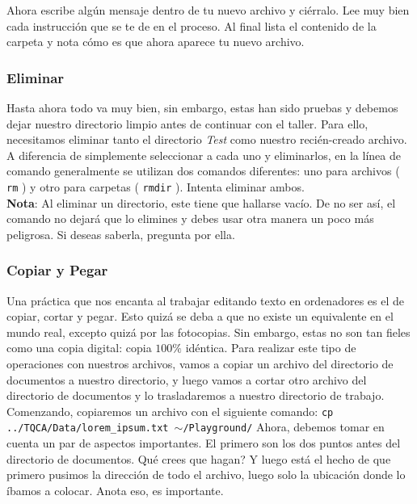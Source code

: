 \documentclass[10pt,letterpaper]{article}
\newcommand{\inlinecode}[1]{
\colorbox{light-gray}{\texttt{#1}}
}
\begin{document}
Ahora escribe alg\'un mensaje dentro de tu nuevo archivo y ci\'erralo. Lee muy bien cada instrucci\'on que se te de en el proceso. Al final lista el contenido de la carpeta y nota c\'omo es que ahora aparece tu nuevo archivo.

\subsubsection{Eliminar}
Hasta ahora todo va muy bien, sin embargo, estas han sido pruebas y debemos dejar nuestro directorio limpio antes de continuar con el taller. Para ello, necesitamos eliminar tanto el directorio \emph{Test} como nuestro reci\'en-creado archivo. A diferencia de simplemente seleccionar a cada uno y eliminarlos, en la l\'inea de comando generalmente se utilizan dos comandos diferentes: uno para archivos (\inlinecode{rm}) y otro para carpetas (\inlinecode{rmdir}). Intenta eliminar ambos.\\

\textbf{Nota}: Al eliminar un directorio, este tiene que hallarse vac\'io. De no ser as\'i, el comando no dejar\'a que lo elimines y debes usar otra manera un poco m\'as peligrosa. Si deseas saberla, pregunta por ella.

\subsubsection{Copiar y Pegar}
Una pr\'actica que nos encanta al trabajar editando texto en ordenadores es el de copiar, cortar y pegar. Esto quiz\'a se deba a que no existe un equivalente en el mundo real, excepto quiz\'a por las fotocopias. Sin embargo, estas no son tan fieles como una copia digital: copia $100\%$ id\'entica. Para realizar este tipo de operaciones con nuestros archivos, vamos a copiar un archivo del directorio de documentos a nuestro directorio, y luego vamos a cortar otro archivo del directorio de documentos y lo trasladaremos a nuestro directorio de trabajo.\\

Comenzando, copiaremos un archivo con el siguiente comando: \inlinecode{cp ../TQCA/Data/lorem\_ipsum.txt $\sim$/Playground/} Ahora, debemos tomar en cuenta un par de aspectos importantes. El primero son los dos puntos antes del directorio de documentos. Qu\'e crees que hagan? Y luego est\'a el hecho de que primero pusimos la direcci\'on de todo el archivo, luego solo la ubicaci\'on donde lo \'ibamos a colocar. Anota eso, es importante.\\
\end{document}
